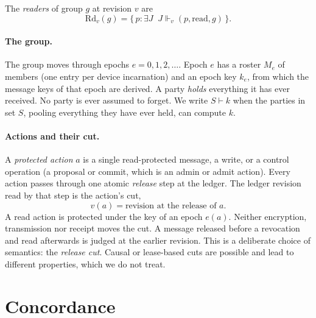 \documentclass[aps,prx,reprint,superscriptaddress,nofootinbib,floatfix]{revtex4-2}
\theoremstyle{remark}
\newcommand{\justifies}{\Vdash}           %
\newcommand{\Rd}{\mathrm{Rd}}             %
\newcommand{\cut}{v}                      %
\newcommand{\roster}{M}
\newcommand{\derives}{\vdash}
\begin{document}
The \emph{readers} of group $g$ at revision $v$ are
\begin{equation}
\Rd_v(g)=\{\,p:\exists J\;\; J\justifies_v (p,\text{read},g)\,\}.
\label{eq:readers}
\end{equation}

\paragraph*{The group.} The group moves through epochs $e=0,1,2,\dots$. Epoch $e$ has a roster $\roster_e$ of members (one entry per device incarnation) and an epoch key $k_e$, from which the message keys of that epoch are derived. A party \emph{holds} everything it has ever received. No party is ever assumed to forget. We write $S\derives k$ when the parties in set $S$, pooling everything they have ever held, can compute $k$.

\paragraph*{Actions and their cut.} A \emph{protected action} $a$ is a single read-protected message, a write, or a control operation (a proposal or commit, which is an admin or admit action). Every action passes through one atomic \emph{release} step at the ledger. The ledger revision read by that step is the action's cut,
\begin{equation}
\cut(a)=\text{revision at the release of }a .
\label{eq:cut}
\end{equation}
A read action is protected under the key of an epoch $e(a)$. Neither encryption, transmission nor receipt moves the cut. A message released before a revocation and read afterwards is judged at the earlier revision. This is a deliberate choice of semantics: the \emph{release cut}. Causal or lease-based cuts are possible and lead to different properties, which we do not treat.

\section{Concordance}\label{sec:concordance}
\end{document}
